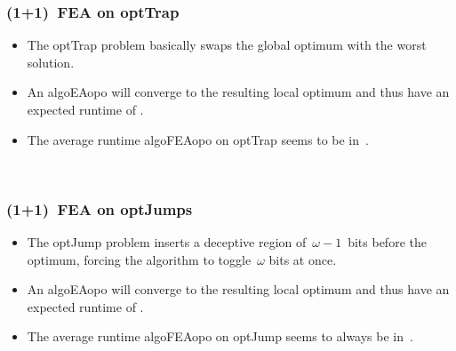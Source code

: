 \documentclass[aspectratio=169,mathserif,notheorems]{beamer}%
\begin{document}
\begin{frame}%
\frametitle{(1+1)~FEA on \gls{optTrap}}%
\parbox{0.37\paperwidth}{%
\begin{itemize}%
\item The \gls{optTrap} problem basically swaps the global optimum with the worst solution\cite{DJW2002OTAOTOPOEA,NB2003AAOTBOSEAOTF}.%
\item<2-> An \gls{algoEAopo} will converge to the resulting local optimum and thus have an expected runtime of \bigThetab{\scale^{\scale}}\cite{DJW2002OTAOTOPOEA}.%
\item<3-> The average runtime \gls{algoFEAopo} on \gls{optTrap} seems to be in~\bigOb{\scale^2 \ln{\scale}}\cite{WWLC2021FFAMOAIUBTOTOFV}.%
\end{itemize}%
}\\%
%
%
%
%
%
\end{frame}%
%
\begin{frame}%
\frametitle{(1+1)~FEA on \glspl{optJump}}%
\parbox{0.37\paperwidth}{%
\begin{itemize}%
\item The \gls{optJump} problem inserts a deceptive region of~$\omega-1$~bits before the optimum, forcing the algorithm to toggle~$\omega$ bits at once\cite{DJW2002OTAOTOPOEA,FQW2018ELDBOAWHTMO}.%
\item<2-> An \gls{algoEAopo} will converge to the resulting local optimum and thus have an expected runtime of \bigThetab{\scale^{\omega}+\scale\ln{\scale}}\cite{DJW2002OTAOTOPOEA}.%
\item<3-> The average runtime \gls{algoFEAopo} on \gls{optJump} seems to \alert{always} be in~\bigOb{\scale^2 \ln{\scale}}\cite{WWLC2021FFAMOAIUBTOTOFV}.%
\end{itemize}%
}\\%
%
%
%
%
%
\end{frame}%
\end{document}
